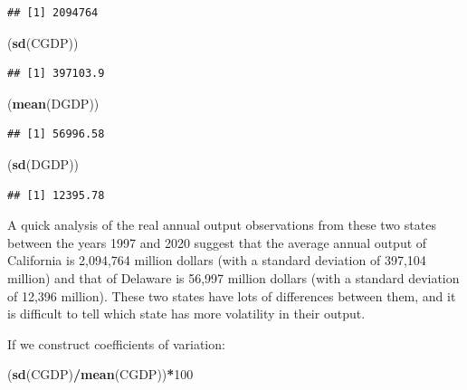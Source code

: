 \documentclass[
]{book}
\newenvironment{Shaded}{\begin{snugshade}}{\end{snugshade}}
\newcommand{\DecValTok}[1]{\textcolor[rgb]{0.00,0.00,0.81}{#1}}
\newcommand{\FunctionTok}[1]{\textcolor[rgb]{0.13,0.29,0.53}{\textbf{#1}}}
\newcommand{\NormalTok}[1]{#1}
\newcommand{\SpecialCharTok}[1]{\textcolor[rgb]{0.81,0.36,0.00}{\textbf{#1}}}
\begin{document}
\begin{verbatim}
## [1] 2094764
\end{verbatim}

\begin{Shaded}
\begin{Highlighting}[]
\NormalTok{(}\FunctionTok{sd}\NormalTok{(CGDP))}
\end{Highlighting}
\end{Shaded}

\begin{verbatim}
## [1] 397103.9
\end{verbatim}

\begin{Shaded}
\begin{Highlighting}[]
\NormalTok{(}\FunctionTok{mean}\NormalTok{(DGDP))}
\end{Highlighting}
\end{Shaded}

\begin{verbatim}
## [1] 56996.58
\end{verbatim}

\begin{Shaded}
\begin{Highlighting}[]
\NormalTok{(}\FunctionTok{sd}\NormalTok{(DGDP))}
\end{Highlighting}
\end{Shaded}

\begin{verbatim}
## [1] 12395.78
\end{verbatim}

A quick analysis of the real annual output observations from these two states between the years 1997 and 2020 suggest that the average annual output of California is 2,094,764 million dollars (with a standard deviation of 397,104 million) and that of Delaware is 56,997 million dollars (with a standard deviation of 12,396 million). These two states have lots of differences between them, and it is difficult to tell which state has more volatility in their output.

If we construct coefficients of variation:

\begin{Shaded}
\begin{Highlighting}[]
\NormalTok{(}\FunctionTok{sd}\NormalTok{(CGDP)}\SpecialCharTok{/}\FunctionTok{mean}\NormalTok{(CGDP))}\SpecialCharTok{*}\DecValTok{100}
\end{Highlighting}
\end{Shaded}
\end{document}
